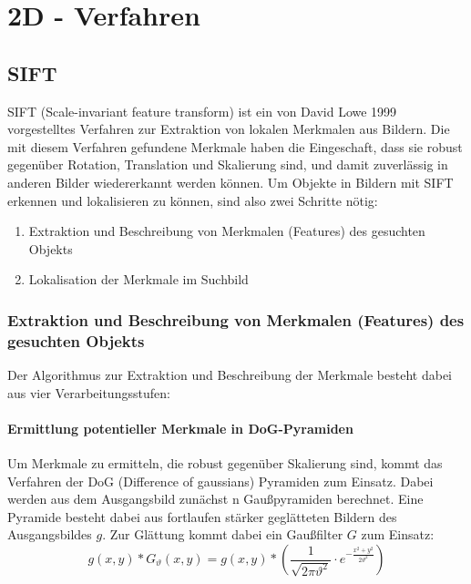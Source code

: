 
\chapter{2D - Verfahren}
\label{chap:2d}
	\section{SIFT}
		SIFT (Scale-invariant feature transform) ist ein von David Lowe 1999 vorgestelltes Verfahren zur Extraktion von lokalen Merkmalen aus Bildern. Die mit diesem Verfahren gefundene Merkmale haben die Eingeschaft, dass sie robust gegenüber Rotation, Translation und Skalierung sind, und damit zuverlässig in anderen Bilder wiedererkannt werden können.
Um Objekte in Bildern mit SIFT erkennen und lokalisieren zu können, sind also zwei Schritte nötig:
\begin{enumerate}
	\item Extraktion und Beschreibung von Merkmalen (Features) des gesuchten Objekts
	\item Lokalisation der Merkmale im Suchbild
\end{enumerate}

\subsection{Extraktion und Beschreibung von Merkmalen (Features) des gesuchten Objekts}
Der Algorithmus zur Extraktion und Beschreibung der Merkmale besteht dabei aus vier Verarbeitungsstufen:
	\subsubsection{Ermittlung potentieller Merkmale in DoG-Pyramiden}
		Um Merkmale zu ermitteln, die robust gegenüber Skalierung sind, kommt das Verfahren der DoG (Difference of gaussians) Pyramiden zum Einsatz. Dabei werden aus dem Ausgangsbild zunächst n Gaußpyramiden berechnet. Eine Pyramide besteht dabei aus fortlaufen stärker geglätteten Bildern des Ausgangsbildes $g$. Zur Glättung kommt dabei ein Gaußfilter $G$ zum Einsatz:
\begin{equation*}
 g(x, y) * G_\vartheta (x, y) = g(x, y) * (\frac{1}{\sqrt{2\pi \vartheta ^2}}\cdot e^{-\frac{x^2 + y^2}{2\vartheta ^2}})
\end{equation*}

